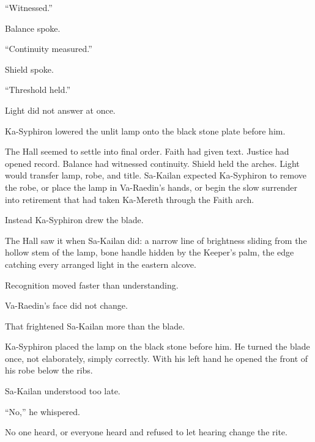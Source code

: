“Witnessed.”\par

Balance spoke.\par

“Continuity measured.”\par

Shield spoke.\par

“Threshold held.”\par

Light did not answer at once.\par

Ka-Syphiron lowered the unlit lamp onto the black stone plate before him.\par

The Hall seemed to settle into final order. Faith had given text. Justice had opened record. Balance had witnessed continuity. Shield held the arches. Light would transfer lamp, robe, and title. Sa-Kailan expected Ka-Syphiron to remove the robe, or place the lamp in Va-Raedin’s hands, or begin the slow surrender into retirement that had taken Ka-Mereth through the Faith arch.\par

Instead Ka-Syphiron drew the blade.\par

The Hall saw it when Sa-Kailan did: a narrow line of brightness sliding from the hollow stem of the lamp, bone handle hidden by the Keeper’s palm, the edge catching every arranged light in the eastern alcove.\par

Recognition moved faster than understanding.\par

Va-Raedin’s face did not change.\par

That frightened Sa-Kailan more than the blade.\par

Ka-Syphiron placed the lamp on the black stone before him. He turned the blade once, not elaborately, simply correctly. With his left hand he opened the front of his robe below the ribs.\par

Sa-Kailan understood too late.\par

“No,” he whispered.\par

No one heard, or everyone heard and refused to let hearing change the rite.\par

